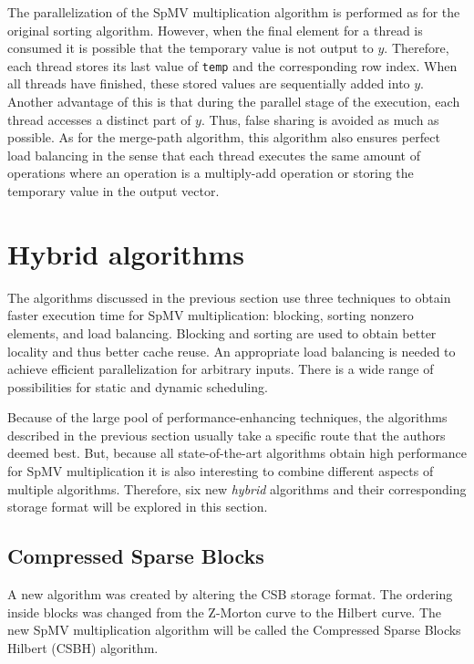\documentclass{siamart220329}
\begin{document}
The parallelization of the SpMV multiplication algorithm is performed as for the original sorting algorithm. However, when the final element for a thread is consumed it is possible that the temporary value is not output to $y$. Therefore, each thread stores its last value of \texttt{temp} and the corresponding row index. When all threads have finished, these stored values are sequentially added into $y$. Another advantage of this is that during the parallel stage of the execution, each thread accesses a distinct part of $y$. Thus, false sharing is avoided as much as possible. As for the merge-path algorithm, this algorithm also ensures perfect load balancing in the sense that each thread executes the same amount of operations where an operation is a multiply-add operation or storing the temporary value in the output vector.

\section{Hybrid algorithms}\label{sec:hybrid}
The algorithms discussed in the previous section use three techniques to obtain faster execution time for SpMV multiplication: blocking, sorting nonzero elements, and load balancing. Blocking and sorting are used to obtain better locality and thus better cache reuse. An appropriate load balancing is needed to achieve efficient parallelization for arbitrary inputs. There is a wide range of possibilities for static and dynamic scheduling.

Because of the large pool of performance-enhancing techniques, the algorithms described in the previous section usually take a specific route that the authors deemed best. But, because all state-of-the-art algorithms obtain high performance for SpMV multiplication it is also interesting to combine different aspects of multiple algorithms. Therefore, six new \textit{hybrid} algorithms and their corresponding storage format will be explored in this section.

\subsection{Compressed Sparse Blocks}\label{sec:CSBH}
A new algorithm was created by altering the CSB storage format. The ordering inside blocks was changed from the Z-Morton curve to the Hilbert curve. The new SpMV multiplication algorithm will be called the Compressed Sparse Blocks Hilbert (CSBH) algorithm.
\end{document}
